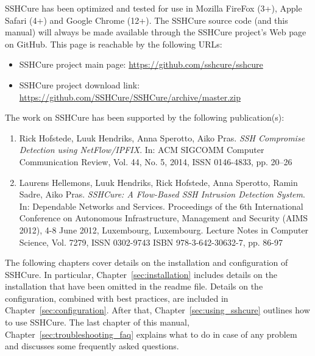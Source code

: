 SSHCure has been optimized and tested for use in Mozilla FireFox (3+), Apple Safari (4+) and Google Chrome (12+). The SSHCure source code (and this manual) will always be made available through the SSHCure project's Web page on GitHub. This page is reachable by the following URLs:

\begin{itemize}
	\item SSHCure project main page: \url{https://github.com/sshcure/sshcure}
	\item SSHCure project download link: \url{https://github.com/SSHCure/SSHCure/archive/master.zip}
\end{itemize}

The work on SSHCure has been supported by the following publication(s):

\begin{enumerate}
	\item Rick Hofstede, Luuk Hendriks, Anna Sperotto, Aiko Pras. \textit{SSH Compromise Detection using NetFlow/IPFIX}. In: ACM SIGCOMM Computer Communication Review, Vol. 44, No. 5, 2014, ISSN 0146-4833, pp. 20--26
	
	\item Laurens Hellemons, Luuk Hendriks, Rick Hofstede, Anna Sperotto, Ramin Sadre, Aiko Pras. \textit{SSHCure: A Flow-Based SSH Intrusion Detection System}. In: Dependable Networks and Services. Proceedings of the 6th International Conference on Autonomous Infrastructure, Management and Security (AIMS 2012), 4-8 June 2012, Luxembourg, Luxembourg. Lecture Notes in Computer Science, Vol. 7279, ISSN 0302-9743 ISBN 978-3-642-30632-7, pp. 86-97
\end{enumerate}

The following chapters cover details on the installation and configuration of SSHCure. In particular, Chapter~\ref{sec:installation} includes details on the installation that have been omitted in the readme file. Details on the configuration, combined with best practices, are included in Chapter~\ref{sec:configuration}. After that, Chapter~\ref{sec:using_sshcure} outlines how to use SSHCure. The last chapter of this manual, Chapter~\ref{sec:troubleshooting_faq} explains what to do in case of any problem and discusses some frequently asked questions.
